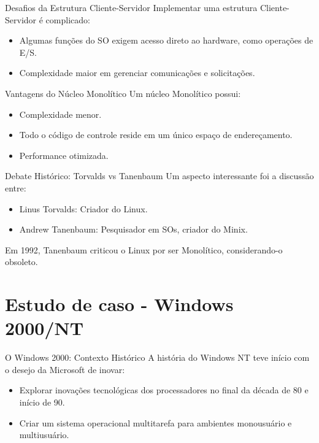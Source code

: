 \documentclass{beamer}
\begin{document}
\begin{frame}{Desafios da Estrutura Cliente-Servidor}
    Implementar uma estrutura Cliente-Servidor é complicado:
    \begin{itemize}
        \item Algumas funções do SO exigem acesso direto ao hardware, como operações de E/S.
        \item Complexidade maior em gerenciar comunicações e solicitações.
    \end{itemize}
\end{frame}

\begin{frame}{Vantagens do Núcleo Monolítico}
    Um núcleo Monolítico possui:
    \begin{itemize}
        \item Complexidade menor.
        \item Todo o código de controle reside em um único espaço de endereçamento.
        \item Performance otimizada.
    \end{itemize}
\end{frame}

\begin{frame}{Debate Histórico: Torvalds vs Tanenbaum}
    Um aspecto interessante foi a discussão entre:
    \begin{itemize}
        \item Linus Torvalds: Criador do Linux.
        \item Andrew Tanenbaum: Pesquisador em SOs, criador do Minix.
    \end{itemize}
    Em 1992, Tanenbaum criticou o Linux por ser Monolítico, considerando-o obsoleto.
\end{frame}







\section{Estudo de caso - Windows 2000/NT}
\begin{frame}{O Windows 2000: Contexto Histórico}
    A história do Windows NT teve início com o desejo da Microsoft de inovar:
    \begin{itemize}
        \item Explorar inovações tecnológicas dos processadores no final da década de 80 e início de 90.
        \item Criar um sistema operacional multitarefa para ambientes monousuário e multiusuário.
    \end{itemize}
\end{frame}
\end{document}
